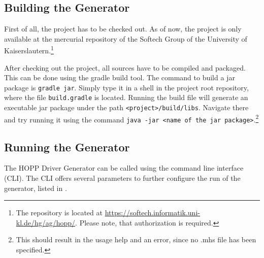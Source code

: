 \documentclass{report}
\begin{document}
%
%
%
%
%
%
%

\subsection{Building the Generator}
First of all, the project has to be checked out. As of now, the project is only available at the mercurial repository of the Softech Group of the University of Kaiserslautern.\footnote{The repository is located at \url{https://softech.informatik.uni-kl.de/hg/ag/hopp/}. Please note, that authorization is required.}

After checking out the project, all sources have to be compiled and packaged. This can be done using the gradle build tool. The command to build a jar package is \texttt{gradle jar}. Simply type it in a shell in the project root repository, where the file \texttt{build.gradle} is located. Running the build file will generate an executable jar package under the path \texttt{<project>/build/libs}. Navigate there and try running it using the command \texttt{java -jar <name of the jar package>}.\footnote{This should result in the usage help and an error, since no .mhs file has been specified.} 

\subsection{Running the Generator}
The HOPP Driver Generator can be called using the command line interface (CLI). The CLI offers several parameters to further configure the run of the generator, listed in .
\end{document}

